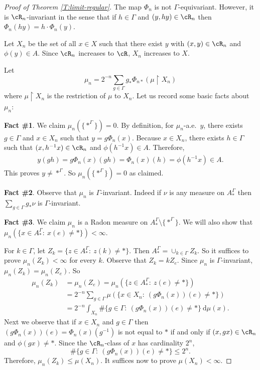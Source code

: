 \documentclass[12pt]{article}
\theoremstyle{plain}
\theoremstyle{definition}
\theoremstyle{remark}
\newcommand{\G}{\Gamma}
\newcommand{\resto}{\upharpoonright}
\newcommand{\dee}{\textrm{d}}
\begin{document}
\begin{proof}[Proof of Theorem \ref{T:limit-regular}]
The map $\Phi_n$ is not $\G$-equivariant. However, it is  $\cR_n$-invariant in the sense that if $h\in \G$ and $(y,hy) \in \cR_n$ then $\Phi_{n}(hy)=h\cdot \Phi_{n}(y)$.  



Let $X_n$ be the set of all $x\in X$ such that there exist $y$ with $(x,y)\in \cR_n$ and $\phi(y)\in A$. Since $\cR_n$ increases to $\cR$, $X_n$ increases to $X$. 

Let 
$$\mu_n = 2^{-n} \sum_{g\in \G} g_*\Phi_{n*}(\mu\resto X_n)$$
where $\mu \resto X_n$ is the restriction of $\mu$ to $X_n$. Let us record some basic facts about $\mu_n$:

{\bf Fact \#1}. We claim $\mu_n(\{*^\G\})=0$. By definition, for $\mu_n$-a.e.\ $y$, there exists $g\in \G$ and $x\in X_n$ such that $y=g\Phi_n(x)$. Because $x\in X_n$, there exists $h\in \G$ such that $(x,h^{-1}x)\in \cR_n$ and $\phi(h^{-1}x)\in A$. Therefore, 
\begin{align*}
    y(gh) = g\Phi_n(x)(gh) = \Phi_n(x)(h) = \phi(h^{-1}x) \in A.
\end{align*}
This proves $y \ne *^\G$. So $\mu_n(\{*^\G\})=0$ as claimed.

{\bf Fact \#2}.  Observe that $\mu_n$ is $\G$-invariant. Indeed if $\nu$ is any measure on $A_*^\G$ then $\sum_{g\in \G} g_*\nu$ is $\G$-invariant.

{\bf Fact \#3}. We claim $\mu_n$ is a Radon measure on $A_*^\G \setminus \{*^\G\}$. We will also show that  $\mu_n(\{x\in A_*^\G:~ x(e) \ne *\})<\infty$. 


For $k\in \G$, let $Z_k = \{z\in A_*^\G:~z(k)\ne *\}$. Then $A_*^\G=\cup_{k\in \G} Z_k$. So it suffices to prove $\mu_n(Z_k)<\infty$ for every $k$. Observe that $Z_k=kZ_e$. Since $\mu_n$ is $\G$-invariant, $\mu_n(Z_k)=\mu_n(Z_e)$. So
\begin{align*}
   \mu_n(Z_k)&=\mu_n(Z_e)= \mu_n(\{z\in A_*^\G:~z(e)\ne *\})\\
   &= 2^{-n} \sum_{g\in \G} \mu(\{x\in X_n:~(g\Phi_n(x))(e)\ne *\}) \\
   &=2^{-n} \int_{X_n} \#\{g\in \G:~(g\Phi_n(x))(e)\ne *\}~\dee\mu(x).
\end{align*}
Next we observe that if $x\in X_n$ and $g\in \G$ then $(g\Phi_n(x))(e)=\Phi_n(x)(g^{-1})$ is not equal to $*$ if and only if $(x,gx) \in \cR_n$ and $\phi(gx)\ne *$. Since the $\cR_n$-class of $x$ has cardinality $2^n$, 
$$\#\{g\in \G:~(g\Phi_n(x))(e)\ne *\}\le 2^n.$$
Therefore, $\mu_n(Z_k) \le \mu(X_n)$. It suffices now to prove $\mu(X_n)<\infty$. 


\end{proof}
\end{document}
